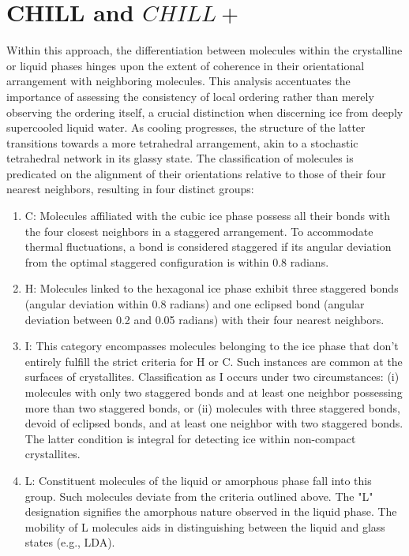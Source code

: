 \section{CHILL and $CHILL+$}
Within this approach, the differentiation between molecules within the crystalline or liquid phases hinges upon the extent of coherence in their orientational arrangement with neighboring molecules\cite{Moore2010}. This analysis accentuates the importance of assessing the consistency of local ordering rather than merely observing the ordering itself, a crucial distinction when discerning ice from deeply supercooled liquid water. As cooling progresses, the structure of the latter transitions towards a more tetrahedral arrangement, akin to a stochastic tetrahedral network in its glassy state.
The classification of molecules is predicated on the alignment of their orientations relative to those of their four nearest neighbors, resulting in four distinct groups:
\begin{enumerate}
\item C: Molecules affiliated with the cubic ice phase possess all their bonds with the four closest neighbors in a staggered arrangement. To accommodate thermal fluctuations, a bond is considered staggered if its angular deviation from the optimal staggered configuration is within 0.8 radians.
\item H: Molecules linked to the hexagonal ice phase exhibit three staggered bonds (angular deviation within 0.8 radians) and one eclipsed bond (angular deviation between 0.2 and 0.05 radians) with their four nearest neighbors.
\item I: This category encompasses molecules belonging to the ice phase that don't entirely fulfill the strict criteria for H or C. Such instances are common at the surfaces of crystallites. Classification as I occurs under two circumstances: (i) molecules with only two staggered bonds and at least one neighbor possessing more than two staggered bonds, or (ii) molecules with three staggered bonds, devoid of eclipsed bonds, and at least one neighbor with two staggered bonds. The latter condition is integral for detecting ice within non-compact crystallites.
\item L: Constituent molecules of the liquid or amorphous phase fall into this group. Such molecules deviate from the criteria outlined above. The "L" designation signifies the amorphous nature observed in the liquid phase. The mobility of L molecules aids in distinguishing between the liquid and glass states (e.g., LDA).
\end{enumerate}
